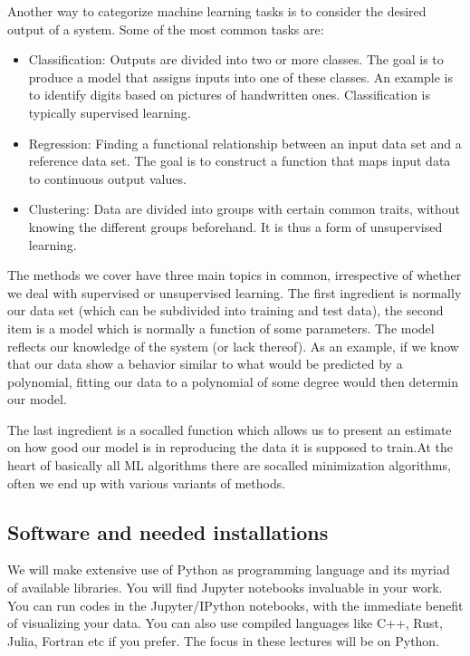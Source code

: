 \documentclass[letterpaper,10pt,english]{sphinxmanual}
\begin{document}
Another way to categorize machine learning tasks is to consider the
desired output of a system.  Some of the most common tasks are:
\begin{itemize}
\item {} 
Classification: Outputs are divided into two or more classes. The goal is to   produce a model that assigns inputs into one of these classes. An example is to identify  digits based on pictures of hand\sphinxhyphen{}written ones. Classification is typically supervised learning.

\item {} 
Regression: Finding a functional relationship between an input data set and a reference data set.   The goal is to construct a function that maps input data to continuous output values.

\item {} 
Clustering: Data are divided into groups with certain common traits, without knowing the different groups beforehand.  It is thus a form of unsupervised learning.

\end{itemize}

The methods we cover have three main topics in common, irrespective of
whether we deal with supervised or unsupervised learning. The first
ingredient is normally our data set (which can be subdivided into
training and test data), the second item is a model which is normally a
function of some parameters.  The model reflects our knowledge of the system (or lack thereof). As an example, if we know that our data show a behavior similar to what would be predicted by a polynomial, fitting our data to a polynomial of some degree would then determin our model.

The last ingredient is a so\sphinxhyphen{}called 
function which allows us to present an estimate on how good our model
is in reproducing the data it is supposed to train.At the heart of basically all ML algorithms there are so\sphinxhyphen{}called minimization algorithms, often we end up with various variants of  methods.


\subsection{Software and needed installations}
\label{\detokenize{chapter2:software-and-needed-installations}}
We will make extensive use of Python as programming language and its
myriad of available libraries.  You will find
Jupyter notebooks invaluable in your work.  You can run 
codes in the Jupyter/IPython notebooks, with the immediate benefit of
visualizing your data. You can also use compiled languages like C++,
Rust, Julia, Fortran etc if you prefer. The focus in these lectures will be
on Python.
\end{document}
